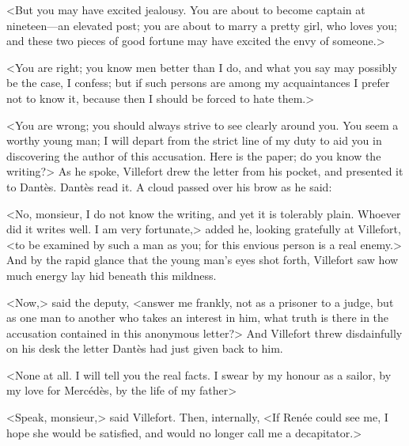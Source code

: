  <But you may have excited jealousy. You are about to become captain at nineteen—an elevated post; you are about to marry a pretty girl, who loves you; and these two pieces of good fortune may have excited the envy of someone.> 

 <You are right; you know men better than I do, and what you say may possibly be the case, I confess; but if such persons are among my acquaintances I prefer not to know it, because then I should be forced to hate them.> 

 <You are wrong; you should always strive to see clearly around you. You seem a worthy young man; I will depart from the strict line of my duty to aid you in discovering the author of this accusation. Here is the paper; do you know the writing?> As he spoke, Villefort drew the letter from his pocket, and presented it to Dantès. Dantès read it. A cloud passed over his brow as he said: 

 <No, monsieur, I do not know the writing, and yet it is tolerably plain. Whoever did it writes well. I am very fortunate,> added he, looking gratefully at Villefort, <to be examined by such a man as you; for this envious person is a real enemy.> And by the rapid glance that the young man's eyes shot forth, Villefort saw how much energy lay hid beneath this mildness. 

 <Now,> said the deputy, <answer me frankly, not as a prisoner to a judge, but as one man to another who takes an interest in him, what truth is there in the accusation contained in this anonymous letter?> And Villefort threw disdainfully on his desk the letter Dantès had just given back to him. 

 <None at all. I will tell you the real facts. I swear by my honour as a sailor, by my love for Mercédès, by the life of my father\longdash> 

 <Speak, monsieur,> said Villefort. Then, internally, <If Renée could see me, I hope she would be satisfied, and would no longer call me a decapitator.> 

